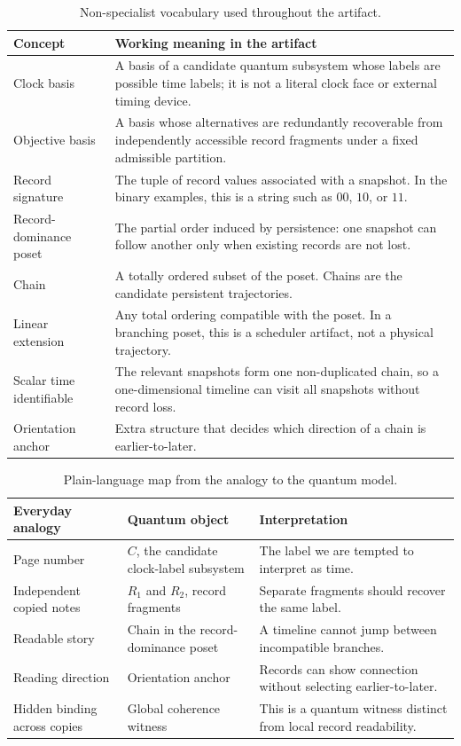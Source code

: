 \documentclass[11pt]{article}
\begin{document}
\begin{table}[htbp]
\centering
\begin{tabularx}{\textwidth}{@{}P{0.26\textwidth}Y@{}}
\toprule
Concept & Working meaning in the artifact \\
\midrule
Clock basis &
A basis of a candidate quantum subsystem whose labels are possible time labels;
it is not a literal clock face or external timing device. \\
Objective basis &
A basis whose alternatives are redundantly recoverable from independently
accessible record fragments under a fixed admissible partition. \\
Record signature &
The tuple of record values associated with a snapshot.  In the binary examples,
this is a string such as \(00\), \(10\), or \(11\). \\
Record-dominance poset &
The partial order induced by persistence: one snapshot can follow another only
when existing records are not lost. \\
Chain &
A totally ordered subset of the poset.  Chains are the candidate persistent
trajectories. \\
Linear extension &
Any total ordering compatible with the poset.  In a branching poset, this is a
scheduler artifact, not a physical trajectory. \\
Scalar time identifiable &
The relevant snapshots form one non-duplicated chain, so a one-dimensional
timeline can visit all snapshots without record loss. \\
Orientation anchor &
Extra structure that decides which direction of a chain is earlier-to-later. \\
\bottomrule
\end{tabularx}
\caption{Non-specialist vocabulary used throughout the artifact.}
\end{table}

\begin{table}[htbp]
\centering
\begin{tabularx}{\textwidth}{@{}P{0.24\textwidth}P{0.31\textwidth}Y@{}}
\toprule
Everyday analogy & Quantum object & Interpretation \\
\midrule
Page number &
\(C\), the candidate clock-label subsystem &
The label we are tempted to interpret as time. \\
Independent copied notes &
\(R_1\) and \(R_2\), record fragments &
Separate fragments should recover the same label. \\
Readable story &
Chain in the record-dominance poset &
A timeline cannot jump between incompatible branches. \\
Reading direction &
Orientation anchor &
Records can show connection without selecting earlier-to-later. \\
Hidden binding across copies &
Global coherence witness &
This is a quantum witness distinct from local record readability. \\
\bottomrule
\end{tabularx}
\caption{Plain-language map from the analogy to the quantum model.}
\end{table}
\end{document}
